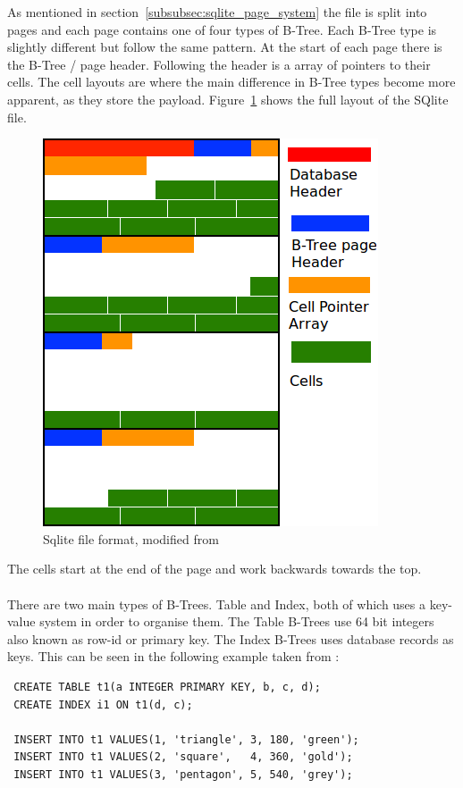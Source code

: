 As mentioned in section~\ref{subsubsec:sqlite_page_system} the file is split into pages and each page contains one of four types of B-Tree. Each B-Tree type is slightly different but follow the same pattern. At the start of each page there is the B-Tree / page header. Following the header is a array of pointers to their cells. The cell layouts are where the main difference in B-Tree types become more apparent, as they store the payload. Figure~\ref{fig:sqlite_file_format} shows the full layout of the SQlite file.

\begin{figure}[H]
	\centering
	\includegraphics[scale=0.5]{images/sqlite_file_format.png}
	\caption{Sqlite file format, modified from \cite{sausagefactory}}
	\label{fig:sqlite_file_format}
\end{figure}

The cells start at the end of the page and work backwards towards the top.
\\\\
There are two main types of B-Trees. Table and Index, both of which uses a key-value system in order to organise them. The Table B-Trees use 64 bit integers also known as row-id or primary key. The Index B-Trees uses database records as keys. This can be seen in the following example taken from \cite{sqliteray}:

\begin{lstlisting}
 CREATE TABLE t1(a INTEGER PRIMARY KEY, b, c, d);
 CREATE INDEX i1 ON t1(d, c);

 INSERT INTO t1 VALUES(1, 'triangle', 3, 180, 'green');
 INSERT INTO t1 VALUES(2, 'square',   4, 360, 'gold');
 INSERT INTO t1 VALUES(3, 'pentagon', 5, 540, 'grey');
\end{lstlisting}

